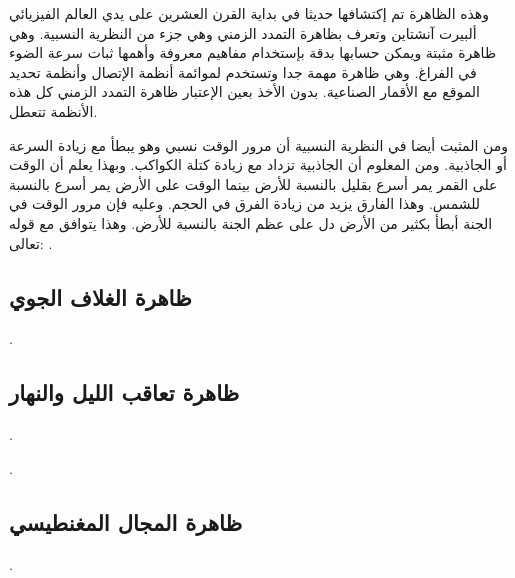 وهذه الظاهرة تم إكتشافها حديثا في بداية القرن العشرين على يدي العالم الفيزيائي ألبيرت آنشتاين وتعرف بظاهرة التمدد الزمني وهي جزء من النظرية النسبية. وهي ظاهرة مثبتة ويمكن حسابها بدقة بإستخدام مفاهيم معروفة وأهمها ثبات سرعة الضوء في الفراغ. وهي ظاهرة مهمة جدا وتستخدم لموائمة أنظمة الإتصال وأنظمة تحديد الموقع مع الأقمار الصناعية. بدون الأخذ بعين الإعتبار ظاهرة التمدد الزمني كل هذه الأنظمة تتعطل.

ومن المثبت أيضا في النظرية النسبية أن مرور الوقت نسبي وهو يبطأ مع زيادة السرعة أو الجاذبية. ومن المعلوم أن الجاذبية تزداد مع زيادة كتلة الكواكب. وبهذا يعلم أن الوقت على القمر يمر أسرع بقليل بالنسبة للأرض بينما الوقت على الأرض يمر أسرع بالنسبة للشمس. وهذا الفارق يزيد من زيادة الفرق في الحجم. وعليه فإن مرور الوقت في الجنة أبطأ بكثير من الأرض دل على عظم الجنة بالنسبة للأرض. وهذا يتوافق مع قوله تعالى:
\quranayah*[3][133]{\footnotesize \surahname*[3]}.




\subsection{ظاهرة الغلاف الجوي}

\quranayah*[36][36-40]{\footnotesize \surahname*[36]}.


\subsection{ظاهرة تعاقب الليل والنهار}

\quranayah*[3][27]{\footnotesize \surahname*[3]}.

\quranayah*[24][44]{\footnotesize \surahname*[24]}.


\subsection{ظاهرة المجال المغنطيسي}

\quranayah*[21][32]{\footnotesize \surahname*[21]}.


